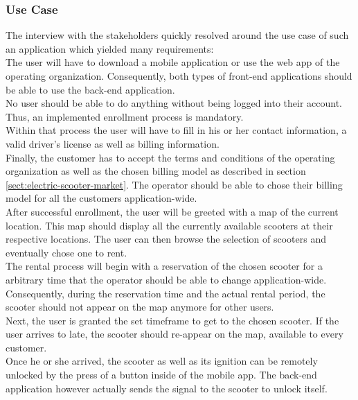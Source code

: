 \documentclass[12pt,a4paper]{report}
\begin{document}
\subsubsection{Use Case}

The interview with the stakeholders quickly resolved around the use case
of such an application which yielded many requirements:\\

The user will have to download a mobile application or use the web app
of the operating organization. Consequently, both types of front-end applications
should be able to use the back-end application.\\

No user should be able to do anything without being logged into their account.
Thus, an implemented enrollment process is mandatory.\\

Within that process the user will have to fill in his or her
contact information, a valid driver's license as well as billing information.\\

Finally, the customer has to accept the terms and conditions of the operating
organization as well as the chosen billing model as described in
section \ref{sect:electric-scooter-market}. The operator should be able to chose
their billing model for all the customers application-wide.\\

After successful enrollment, the user will be greeted with a map of the current
location. This map should display all the currently available scooters at
their respective locations. The user can then browse the selection
of scooters and eventually chose one to rent.\\

The rental process will begin with a reservation of the chosen scooter for
a arbitrary time that the operator should be able to change application-wide.\\

Consequently, during the reservation time and the actual rental period,
the scooter should not appear on the map anymore for other users.\\

Next, the user is granted the set timeframe to get to the chosen scooter.
If the user arrives to late, the scooter should re-appear on the map,
available to every customer.\\

Once he or she arrived, the scooter as well as its ignition can be remotely
unlocked by the press of a button inside of the mobile app.
The back-end application however actually sends the signal to the scooter to
unlock itself.\\
\end{document}

